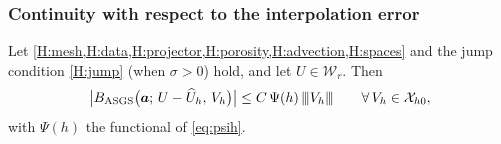 \subsubsection{Continuity with respect to the interpolation error}

\begin{lemma}\label{lem:continterp}
Let \cref{H:mesh,H:data,H:projector,H:porosity,H:advection,H:spaces} and the jump condition \cref{H:jump} (when $\sigma>0$) hold, and let $U\in\mathcal{W}_r$. Then
\begin{equation}\label{eq:continterp}
  \bigl|B_{\mathrm{ASGS}} \bigl(\boldsymbol{a};\,U-\widehat{U}_h,\,V_h\bigr)\bigr|
  \le C\,\Psi(h)\,{\lvert\kern-0.25ex\lvert\kern-0.25ex\lvert V_h \rvert\kern-0.25ex\rvert\kern-0.25ex\rvert}
  \qquad\forall\,V_h\in\mathcal{X}_{h0} ,
\end{equation}
with $\Psi(h)$ the functional of \eqref{eq:psih}.
\end{lemma}

